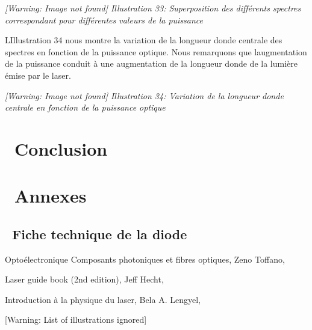 \documentclass[12pt,twoside]{article}
\begin{document}
\begin{minipage}{15.334cm}
{\itshape
 [Warning: Image not found] Illustration
33\label{seq:refIllustration32}: Superposition des diff\'erents
spectres correspondant pour diff\'erentes valeurs de la puissance}
\end{minipage}

L{\textquotesingle}Illustration 34 nous montre la variation de la
longueur d{\textquotesingle}onde centrale des spectres en fonction de
la puissance optique. Nous remarquons que
l{\textquotesingle}augmentation de la puissance conduit \`a une
augmentation de la longueur d{\textquotesingle}onde de la lumi\`ere
\'emise par le laser. 

\begin{minipage}{15.334cm}
{\itshape
 [Warning: Image not found] Illustration
34\label{seq:refIllustration33}: Variation de la longueur
d{\textquotesingle}onde centrale en fonction de la puissance optique}
\end{minipage}

\section[\ Conclusion]{\ Conclusion}
\section[\ Annexes]{\ Annexes}
\subsection[\ Fiche technique de la diode]{\ Fiche technique de la
diode}

Opto\'electronique Composants photoniques et fibres optiques, Zeno
Toffano,

Laser guide \foreignlanguage{english}{book} (2nd
\foreignlanguage{english}{edition}), \foreignlanguage{english}{Jeff}
Hecht,

Introduction \`a la physique du laser, \foreignlanguage{english}{Bela}
A. Lengyel,


\bigskip

[Warning: List of illustrations ignored]


\bigskip
\end{document}
